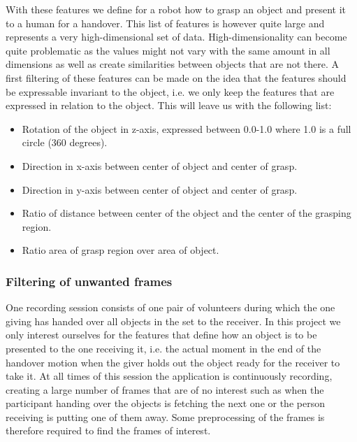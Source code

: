 With these features we define for a robot how to grasp an object and present it to a human for a handover. This list of features is however quite large and represents a very high-dimensional set of data. High-dimensionality can become quite problematic as the values might not vary with the same amount in all dimensions as well as create similarities between objects that are not there. A first filtering of these features can be made on the idea that the features should be expressable invariant to the object, i.e. we only keep the features that are expressed in relation to the object. This will leave us with the following list:

\begin{itemize}
	\item Rotation of the object in z-axis, expressed between 0.0-1.0 where 1.0 is a full circle (360 degrees).
	\item Direction in x-axis between center of object and center of grasp.
	\item Direction in y-axis between center of object and center of grasp.
	\item Ratio of distance between center of the object and the center of the grasping region.
	\item Ratio area of grasp region over area of object.
\end{itemize}


\subsubsection{Filtering of unwanted frames}

One recording session consists of one pair of volunteers during which the one giving has handed over all objects in the set to the receiver. In this project we only interest ourselves for the features that define how an object is to be presented to the one receiving it, i.e. the actual moment in the end of the handover motion when the giver holds out the object ready for the receiver to take it. At all times of this session the application is continuously recording, creating a large number of frames that are of no interest such as when the participant handing over the objects is fetching the next one or the person receiving is putting one of them away. Some preprocessing of the frames is therefore required to find the frames of interest.


